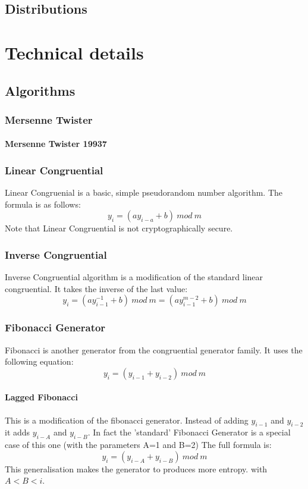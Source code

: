 \documentclass{scrartcl}
\begin{document}
\subsection{Distributions}

\section{Technical details}
\subsection{Algorithms}
\subsubsection{Mersenne Twister}
\paragraph{Mersenne Twister 19937}
\subsubsection{Linear Congruential}
Linear Congruenial is a basic, simple pseudorandom number algorithm. The formula is as follows:
\begin{equation} y_i = (a{y}_{i-a}+b)\:mod\:m \end{equation}
Note that Linear Congruential is not cryptographically secure.
\subsubsection{Inverse Congruential}
Inverse Congruential algorithm is a modification of the standard linear congruential. It takes the inverse of the last value:
\begin{equation}y_i = (a{y}_{i-1}^{-1}+b)\:mod\:m = (a{y}_{i-1}^{m-2}+b)\:mod\:m \end{equation}
\subsubsection{Fibonacci Generator}
Fibonacci is another generator from the congruential generator family. It uses the following equation:
\begin{equation} y_i = (y_{i-1}+y_{i-2})\:mod\:m \end{equation}
\paragraph{Lagged Fibonacci}
This is a modification of the fibonacci generator.  Instead of adding $y_{i-1}$ and $y_{i-2}$ it adds $y_{i-A}$ and $y_{i-B}$. In fact the 'standard' Fibonacci Generator is a special case of this one (with the parameters A=1 and B=2)\newline
The full formula is:
\begin{equation}y_i = (y_{i-A} + y_{i-B})\:mod\:m\end{equation}
This generalisation makes the generator to produces more entropy.
with $A < B < i$.
\end{document}
